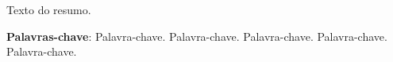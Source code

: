 \begin{resumo}
    Texto do resumo.\par
    \textbf{Palavras-chave}: Palavra-chave. Palavra-chave. Palavra-chave. Palavra-chave. Palavra-chave.
\end{resumo}